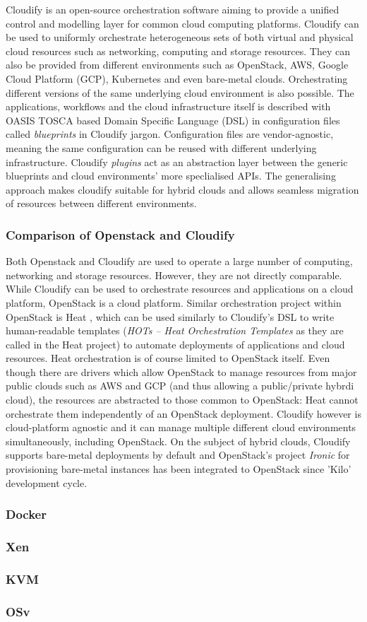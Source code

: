 Cloudify \cite{cloudify} is an open-source orchestration software aiming to provide a unified control and modelling layer for common cloud computing platforms. Cloudify can be used to uniformly orchestrate heterogeneous sets of both virtual and physical cloud resources such as networking, computing and storage resources. They can also be provided from different environments such as OpenStack, AWS, Google Cloud Platform (GCP), Kubernetes and even bare-metal clouds. Orchestrating different versions of the same underlying cloud environment is also possible. The applications, workflows and the cloud infrastructure itself is described with OASIS TOSCA \cite{Tosca} based Domain Specific Language (DSL) in configuration files called \textit{blueprints} in Cloudify jargon. Configuration files are vendor-agnostic, meaning the same configuration can be reused with different underlying infrastructure. Cloudify \textit{plugins} act as an abstraction layer between the generic blueprints and cloud environments' more speclialised APIs. The generalising approach makes cloudify suitable for hybrid clouds and allows seamless migration of resources between different environments.

\subsubsection{Comparison of Openstack and Cloudify}

Both Openstack and Cloudify are used to operate a large number of computing, networking and storage resources. However, they are not directly comparable. While Cloudify can be used to orchestrate resources and applications on a cloud platform, OpenStack is a cloud platform. Similar orchestration project within OpenStack is Heat \cite{heat}, which can be used similarly to Cloudify's DSL to write human-readable templates (\textit{HOTs -- Heat Orchestration Templates} as they are called in the Heat project) to automate deployments of applications and cloud resources. Heat orchestration is of course limited to OpenStack itself. Even though there are drivers which allow OpenStack to manage resources from major public clouds such as AWS and GCP (and thus allowing a public/private hybrdi cloud), the resources are abstracted to those common to OpenStack: Heat cannot orchestrate them independently of an OpenStack deployment. Cloudify however is cloud-platform agnostic and it can manage multiple different cloud environments simultaneously, including OpenStack. On the subject of hybrid clouds, Cloudify supports bare-metal deployments by default and OpenStack's project \textit{Ironic} for provisioning bare-metal instances has  been integrated to OpenStack since 'Kilo' development cycle. 



\subsubsection{Docker}
\subsubsection{Xen}
\subsubsection{KVM}
\subsubsection{OSv}

